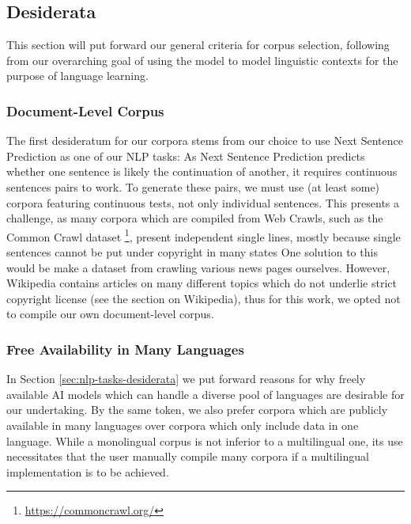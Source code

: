 \subsection{Desiderata}


This section will put forward our general criteria for corpus selection, following from our overarching goal of using the model to model linguistic contexts for the purpose of language learning.


\subsubsection{Document-Level Corpus}
The first desideratum for our corpora stems from our choice to use Next Sentence Prediction as one of our NLP tasks:
As Next Sentence Prediction predicts whether one sentence is likely the continuation of another, it requires continuous sentences pairs to work.
To generate these pairs, we must use (at least some) corpora featuring continuous tests, not only individual sentences.
This presents a challenge, as many corpora which are compiled from Web Crawls, such as the Common Crawl dataset \footnote{\url{https://commoncrawl.org/}}, present independent single lines, mostly because single sentences cannot be put under copyright in many states 
One solution to this would be make a dataset from crawling various news pages ourselves.
However, Wikipedia contains articles on many different topics which do not underlie strict copyright license (see the section on Wikipedia), thus for this work, we opted not to compile our own document-level corpus.

\subsubsection{Free Availability in Many Languages}
In Section \ref{sec:nlp-tasks-desiderata} we put forward reasons for why freely available AI models which can handle a diverse pool of languages are desirable for our undertaking.
By the same token, we also prefer corpora which are publicly available in many languages over corpora which only include data in one language.
While a monolingual corpus is not inferior to a multilingual one, its use necessitates that the user manually compile many corpora if a multilingual implementation is to be achieved.

